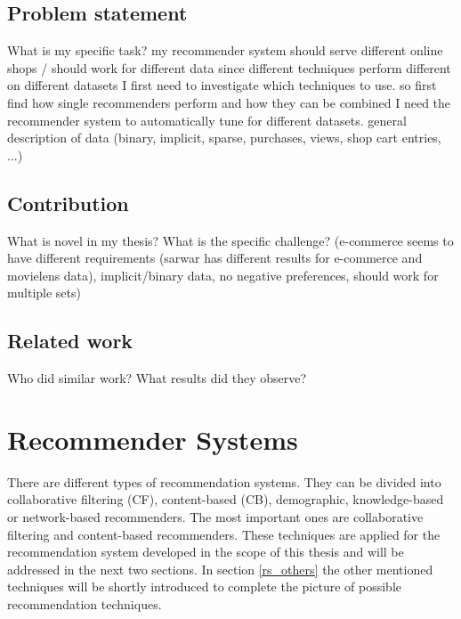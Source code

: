 \documentclass[10pt]{reportMaster}
\begin{document}


\section{Problem statement}
What is my specific task?
my recommender system should serve different online shops / should work for different data
since different techniques perform different on different datasets I first need to investigate which techniques to use.
so first find how single recommenders perform and how they can be combined
I need the recommender system to automatically tune for different datasets.
general description of data (binary, implicit, sparse, purchases, views, shop cart entries, ...)

\section{Contribution}
What is novel in my thesis?
What is the specific challenge? (e-commerce seems to have different requirements (sarwar has different results for e-commerce and movielens data), implicit/binary data, no negative preferences, should work for multiple sets)

\section{Related work}
Who did similar work?
What results did they observe?










\chapter{Recommender Systems}
There are different types of recommendation systems.
They can be divided into collaborative filtering (CF), content-based (CB), demographic, knowledge-based or network-based recommenders. %
The most important ones are collaborative filtering and content-based recommenders.%
These techniques are applied for the recommendation system developed in the scope of this thesis and will be addressed in the next two sections.
In section \ref{rs_others} the other mentioned techniques will be shortly introduced to complete the picture of possible recommendation techniques.
\end{document}

